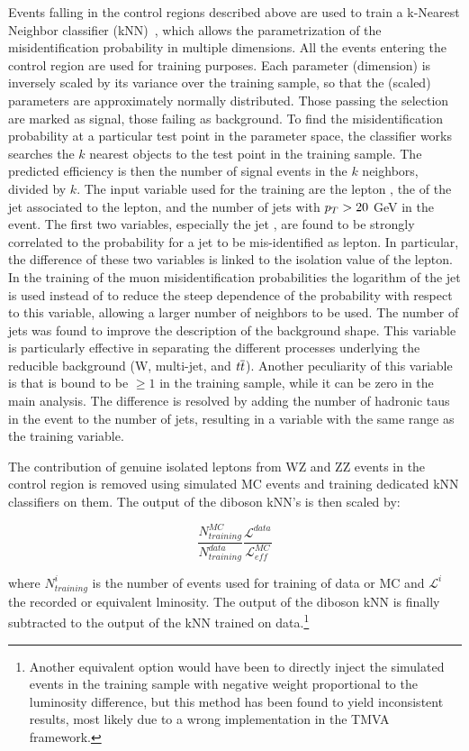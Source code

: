 Events falling in the control regions described above are used to train a k-Nearest Neighbor classifier (kNN)~\cite{TMVA}, which allows the parametrization of the misidentification probability in multiple dimensions. All the events entering the control region are used for training purposes.
Each parameter (dimension) is inversely scaled by its variance over the training sample, so that the (scaled) parameters are approximately normally distributed.
Those passing the selection are marked as signal, those failing as background.
To find the misidentification probability at a particular test point in the parameter space, the classifier works searches the $k$ nearest objects to the test point in the training sample.
The predicted efficiency is then the number of signal events in the $k$ neighbors, divided by $k$.
The input variable used for the training are the lepton \pT, the \pT of the jet associated to the lepton, and the number of jets with $p_{T} > 20$ GeV in the event. 
The first two variables, especially the jet \pT, are found to be strongly correlated to the probability for a jet to be mis-identified as lepton. In particular, the difference of these two variables is linked to the isolation value of the lepton. In the training of the muon misidentification probabilities the logarithm of the jet \pT is used instead of \pT to reduce the steep dependence of the probability with respect to this variable, allowing a larger number of neighbors to be used.
The number of jets was found to improve the description of the background shape. This variable is particularly effective in separating the different processes underlying the reducible background (W, multi-jet, and $t\overline{t}$). Another peculiarity of this variable is that is bound to be $\geq 1$ in the training sample, while it can be zero in the main analysis. The difference is resolved by adding the number of hadronic taus in the event to the number of jets, resulting in a variable with the same range as the training variable.

The contribution of genuine isolated leptons from WZ and ZZ events in the control region is removed using simulated MC events and training dedicated kNN classifiers on them.
The output of the diboson kNN's is then scaled by:

\begin{equation}
\frac{N_{training}^{MC}}{N_{training}^{data}}\frac{\mathcal{L}^{data}}{\mathcal{L}_{eff}^{MC}}
\end{equation}

where $N_{training}^{i}$ is the number of events used for training of data or MC and $\mathcal{L}^{i}$ the recorded or equivalent lminosity. The output of the diboson kNN is finally subtracted to the output of the kNN trained on data.\footnote{Another equivalent option would have been to directly inject the simulated events in the training sample with negative weight proportional to the luminosity difference, but this method has been found to yield inconsistent results, most likely due to a wrong implementation in the TMVA framework.}

